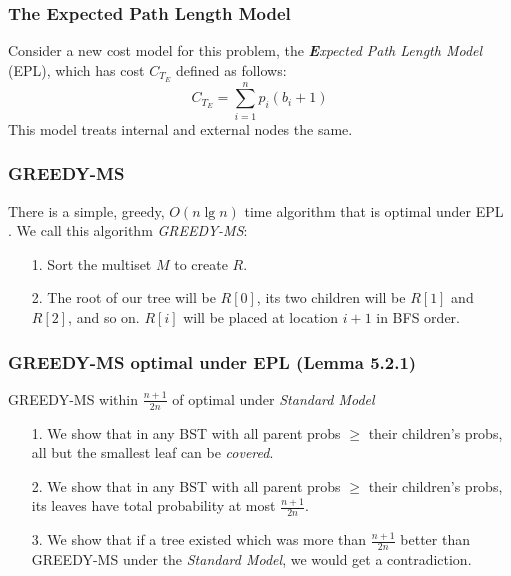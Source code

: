 \documentclass{beamer}
\theoremstyle{plain}
\begin{document}
\begin{frame} \frametitle{The \textbf{E}xpected Path Length Model}
Consider a new cost model for this problem, the \textit{\textbf{E}xpected Path Length Model} (EPL), which has cost $C_{T_E}$ defined as follows:
\begin{equation}
C_{T_E} = \sum_{i=1}^{n} p_i(b_i+1)
\end{equation}
This model treats internal and external nodes the same.
\end{frame}

\begin{frame} \frametitle{GREEDY-MS}
There is a simple, greedy, $O(n \lg n)$ time algorithm that is optimal under EPL \cite{golin2012huffman}. We call this algorithm \textit{GREEDY-MS}:

\begin{itemize}
\item[1.] Sort the multiset $M$ to create $R$.

\item[2.] The root of our tree will be $R[0]$, its two children will be $R[1]$ and $R[2]$, and so on. $R[i]$ will be placed at location $i+1$ in BFS order.
\end{itemize}
\end{frame}

\begin{frame}\frametitle{GREEDY-MS optimal under EPL (Lemma 5.2.1)}
\end{frame}

\begin{frame}{GREEDY-MS within $\frac{n+1}{2n}$ of optimal under \textit{Standard Model} }
\begin{itemize}
\item[1.] We show that in any BST with all parent probs $\geq$ their children's probs, all but the smallest leaf can be \textit{covered}.
\item[2.] We show that in any BST with all parent probs $\geq$ their children's probs, its leaves have total probability at most $\frac{n+1}{2n}$.
\item[3.] We show that if a tree existed which was more than  $\frac{n+1}{2n}$ better than GREEDY-MS under the \textit{Standard Model}, we would get a contradiction.
\end{itemize}
\end{frame}
\end{document}

